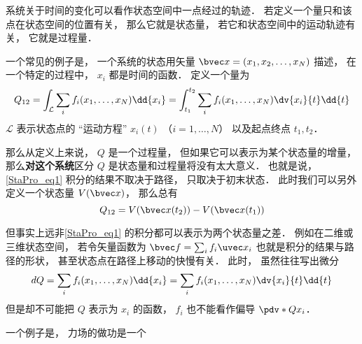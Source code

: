 
\begin{issues}
\issueDraft
\end{issues}

系统关于时间的变化可以看作状态空间中一点经过的轨迹． 若定义一个量只和该点在状态空间的位置有关， 那么它就是状态量， 若它和状态空间中的运动轨迹有关， 它就是过程量．

一个常见的例子是， 一个系统的状态用矢量 $\bvec x = (x_1, x_2, \dots, x_N)$ 描述， 在一个特定的过程中， $x_i$ 都是时间的函数． 定义一个量为
\begin{equation}\label{StaPro_eq1}
Q_{12} = \int_{\mathcal L} \sum_i f_i(x_1, \dots, x_N) \dd{x_i} = \int_{t_1}^{t_2} \sum_i f_i(x_1, \dots, x_N) \dv{x_i}{t} \dd{t}
\end{equation}
$\mathcal L$ 表示状态点的 “运动方程” $x_i(t)$ （$i = 1,\dots, N$） 以及起点终点 $t_1, t_2$．

那么从定义上来说， $Q$ 是一个过程量， 但如果它可以表示为某个状态量的增量， 那么\textbf{对这个系统}区分 $Q$ 是状态量和过程量将没有太大意义． 也就是说， \autoref{StaPro_eq1} 积分的结果不取决于路径， 只取决于初末状态． 此时我们可以另外定义一个状态量 $V(\bvec x)$， 那么总有
\begin{equation}
Q_{12} = V(\bvec x(t_2)) - V(\bvec x(t_1))
\end{equation}

但事实上远非\autoref{StaPro_eq1} 的积分都可以表示为两个状态量之差． 例如在二维或三维状态空间， 若令矢量函数为 $\bvec f = \sum_i f_i \uvec x_i$ 也就是积分的结果与路径的形状， 甚至状态点在路径上移动的快慢有关． 此时， 虽然往往写出微分
\begin{equation}
dQ = \sum_i f_i(x_1, \dots, x_N) \dd{x_i} = \sum_i f_i(x_1, \dots, x_N) \dv{x_i}{t} \dd{t}
\end{equation}
但是却不可能把 $Q$ 表示为 $x_i$ 的函数， $f_i$ 也不能看作偏导 $\pdv*{Q}{x_i}$．

一个例子是， 力场的做功是一个

